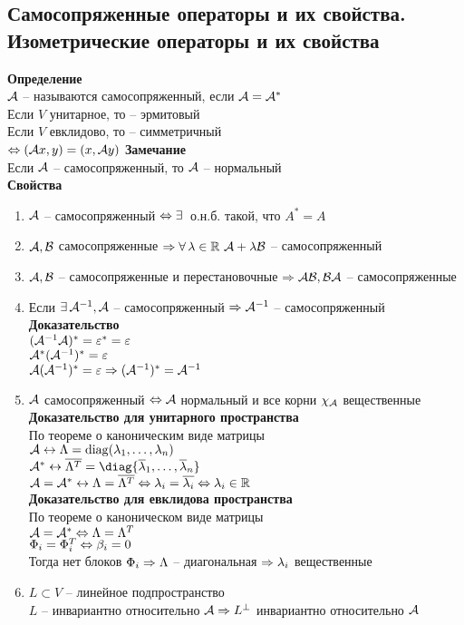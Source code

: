 \documentclass[12pt]{article}
\begin{document}
\subsection{Самосопряженные операторы и их свойства. Изометрические операторы и их свойства}
\textbf{Определение}\\
$\mathcal{A}$ -- называются самосопряженный, если $\mathcal{A} = \mathcal{A}^*$\\
Если $V$ унитарное, то -- эрмитовый\\
Если $V$ евклидово, то -- симметричный\\
$\Leftrightarrow (\mathcal{A} x, y) = (x, \mathcal{A} y)$
\textbf{Замечание}\\
Если $\mathcal{A}$ -- самосопряженный, то $\mathcal{A}$ -- нормальный\\
\textbf{Свойства}
\begin{enumerate}
    \item $\mathcal{A}$ -- самосопряженный $\Leftrightarrow \exists\,$ о.н.б. такой, что $A^* = A$
    \item $\mathcal{A}, \mathcal{B}$ самосопряженные $\Rightarrow \forall\, \lambda \in \mathbb{R}\ \mathcal{A} + \lambda\mathcal{B}$ -- самосопряженный
    \item $\mathcal{A}, \mathcal{B}$ -- самосопряженные и перестановочные $\Rightarrow \mathcal{A}\mathcal{B}, \mathcal{B}\mathcal{A}$ -- самосопряженные
    \item Если $\exists\, \mathcal{A}^{-1}, \mathcal{A}$ -- самосопряженный $\Rightarrow \mathcal{A}^{-1}$ -- самосопряженный\\
    \textbf{Доказательство}\\
    $(\mathcal{A}^{-1}\mathcal{A})^* = \varepsilon^* = \varepsilon$\\
    $\mathcal{A}^* (\mathcal{A}^{-1})^* = \varepsilon$\\
    $\mathcal{A}(\mathcal{A}^{-1})^* = \varepsilon \Rightarrow (\mathcal{A}^{-1})^* = \mathcal{A}^{-1}$
    \item $\mathcal{A}$ самосопряженный $\Leftrightarrow \mathcal{A}$ нормальный и все корни $\chi_\mathcal{A}$ вещественные\\
        \textbf{Доказательство для унитарного пространства}\\
        По теореме о каноническим виде матрицы\\
        $\mathcal{A} \leftrightarrow \Lambda = \operatorname{diag}( \lambda_1, \ldots, \lambda_n)$\\
        $\mcA^* \lrto \ol{ \Lambda^T} = \diag{\ol \lambda_1, \ldots, \ol \lambda_n}$\\
        $\mathcal{A} = \mathcal{A}^* \leftrightarrow \Lambda = \overline{ \Lambda^T} \Leftrightarrow \lambda_i = \overline{ \lambda_i} \Leftrightarrow \lambda_i \in \mathbb{R}$\\
        \textbf{Доказательство для евклидова пространства}\\
        По теореме о каноническом виде матрицы\\
        $\mathcal{A} = \mathcal{A}^* \Leftrightarrow \Lambda = \Lambda^T$\\
        $ \Phi_i = \Phi_i^T \Leftrightarrow \beta_i = 0$\\
        Тогда нет блоков $ \Phi_i \Rightarrow \Lambda$ -- диагональная $\Rightarrow \lambda_i$ вещественные
    \item $L \subset V$ -- линейное подпространство\\
        $L$ -- инвариантно относительно $\mathcal{A} \Rightarrow L^\perp$ инвариантно относительно $\mathcal{A}$
\end{enumerate}
\end{document}

